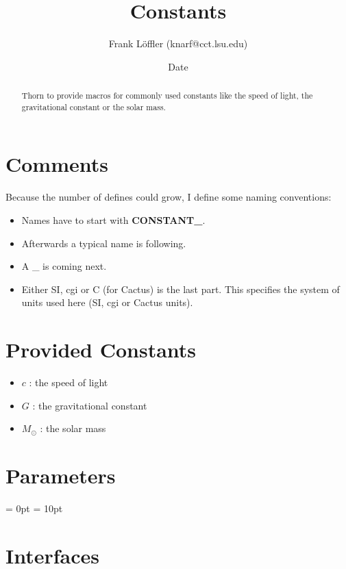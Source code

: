 \documentclass{article}
\begin{document}
\title{Constants}
\author{Frank L\"offler (knarf@cct.lsu.edu)}
\date{$ $Date$ $}

\maketitle


\begin{abstract}
Thorn to provide macros for commonly used constants like the speed of light,
the gravitational constant or the solar mass.
\end{abstract}

\section{Comments}
 Because the number of defines could grow, I define some naming conventions:
 \begin{itemize}
  \item Names have to start with \textbf{CONSTANT\_}.
  \item Afterwards a typical name is following.
  \item A \_ is coming next.
  \item Either SI, cgi or C (for Cactus) is the last part. This specifies the
        system of units used here (SI, cgi or Cactus units).
 \end{itemize}
\section{Provided Constants}
 \begin{itemize}
  \item $c$ : the speed of light
  \item $G$ : the gravitational constant
  \item $M_{\odot}$ : the solar mass
 \end{itemize}
 


\section{Parameters} 


\parskip = 0pt
\parskip = 10pt 

\section{Interfaces} 
\end{document}
